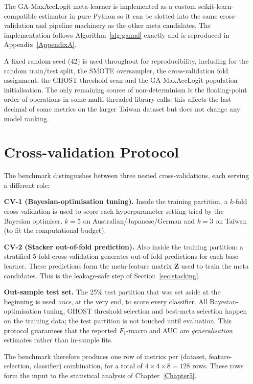 The GA-MaxAccLogit meta-learner is implemented as a custom
scikit-learn-compatible estimator in pure Python so it can be
slotted into the same cross-validation and pipeline machinery as
the other meta candidates. The implementation follows
Algorithm~\ref{alg:gamal} exactly and is reproduced in
Appendix~\ref{AppendixA}.

A fixed random seed (42) is used throughout for reproducibility,
including for the random train/test split, the SMOTE oversampler,
the cross-validation fold assignment, the GHOST threshold scan
and the GA-MaxAccLogit population initialisation. The only
remaining source of non-determinism is the floating-point order of
operations in some multi-threaded library calls; this affects the
last decimal of some metrics on the larger Taiwan dataset but does
not change any model ranking.

\section{Cross-validation Protocol}
\label{sec:cv}

The benchmark distinguishes between three nested cross-validations,
each serving a different role:

\textbf{CV-1 (Bayesian-optimisation tuning).} Inside the training
partition, a $k$-fold cross-validation is used to score each
hyperparameter setting tried by the Bayesian optimiser. $k=5$ on
Australian/Japanese/German and $k=3$ on Taiwan (to fit the
computational budget).

\textbf{CV-2 (Stacker out-of-fold prediction).} Also inside the
training partition: a stratified 5-fold cross-validation generates
out-of-fold predictions for each base learner. These predictions
form the meta-feature matrix $\mathbf{Z}$ used to train the meta
candidates. This is the leakage-safe step of
Section~\ref{sec:stacking}.

\textbf{Out-sample test set.} The 25\% test partition that was set
aside at the beginning is used \emph{once}, at the very end, to
score every classifier. All Bayesian-optimisation tuning,
GHOST threshold selection and best-meta selection happen on the
training data; the test partition is not touched until evaluation.
This protocol guarantees that the reported $F_1$-macro and AUC are
\emph{generalisation} estimates rather than in-sample fits.

The benchmark therefore produces one row of metrics per (dataset,
feature-selection, classifier) combination, for a total of
$4\times 4\times 8 = 128$ rows. These rows form the input to the
statistical analysis of Chapter~\ref{Chapter5}.
